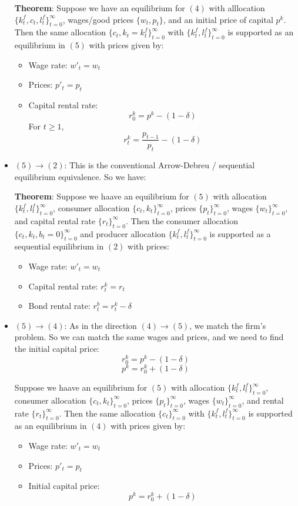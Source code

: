 \documentclass[10pt,letter]{article}
\begin{document}
\begin{itemize}
\textbf{Theorem}: Suppose we have an equilibrium for $(4)$ with alllocation $\{ k_t^f, c_t, l_t^f \}_{t=0}^\infty$, wages/good prices $\{ w_t, p_t \}$, and an initial price of capital $p^k$. Then the same allocation $\{ c_t, k_t = k_t^f \}_{t=0}^\infty$  with $\{ k_t^f, l_t^f \}_{t=0}^\infty$ is supported as an equilibrium in $(5)$ with prices given by:
\begin{itemize}
\item Wage rate: $w'_t = w_t$
\item Prices: $p'_t = p_t$
\item Capital rental rate:
\[ r^k_0  = p^k  - (1-\delta) \]
For $t \ge 1$,
\[ r^k_t = \frac{p_{t-1}}{p_t} - (1-\delta) \]
\end{itemize}
\item $(5) \to (2)$: This is the conventional Arrow-Debreu / sequential equilibrium equivalence. So we have:

\textbf{Theorem}: Suppose we haave an equilibrium for $(5)$ with allocation $\{ k_t^f, l_t^f \}_{t=0}^\infty$, consumer allocation $\{ c_t, k_t \}_{t=0}^\infty$, prices $\{ p_t \}_{t=0}^\infty$, wages $\{ w_t \}_{t=0}^\infty$, and capital rental rate $\{ r_t \}_{t=0}^\infty$. Then the consumer allocation $\{ c_t, k_t, b_t = 0 \}_{t=0}^\infty$ and producer allocation $\{ k_t^f, l_t^f \}_{t=0}^\infty$ is supported as a sequential equilibrium in $(2)$ with prices:
\begin{itemize}
\item Wage rate: $w'_t = w_t$
\item Capital rental rate: $r^k_t = r_t$
\item Bond rental rate: $r^b_t = r^k_t - \delta$
\end{itemize}
\item $(5) \to (4)$: As in the direction $(4) \to (5)$, we match the firm's problem. So we can match the same wages and prices, and we need to find the initial capital price:
\[ r^k_0  = p^k  - (1-\delta) \]
\[ p^k = r^k_0 + (1-\delta) \]

Suppose we haave an equilibrium for $(5)$ with allocation $\{ k_t^f, l_t^f \}_{t=0}^\infty$, consumer allocation $\{ c_t, k_t \}_{t=0}^\infty$, prices $\{ p_t \}_{t=0}^\infty$, wages $\{ w_t \}_{t=0}^\infty$, and rental rate $\{ r_t \}_{t=0}^\infty$. Then the same allocation $\{ c_t \}_{t=0}^\infty$  with $\{ k_t^f, l_t^f \}_{t=0}^\infty$ is supported as an equilibrium in $(4)$ with prices given by:
\begin{itemize}
\item Wage rate: $w'_t = w_t$
\item Prices: $p'_t = p_t$
\item Initial capital price:
\[ p^k = r^k_0 + (1-\delta) \]
\end{itemize}
\end{itemize}
\end{document}
